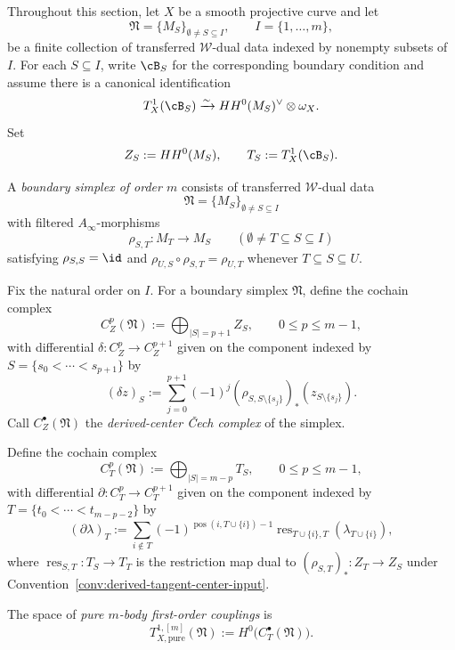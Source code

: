 \begin{convention}
\label{conv:derived-tangent-center-input}
Throughout this section, let $X$ be a smooth projective curve and let
\[
\mathfrak N=\{M_S\}_{\emptyset\neq S\subseteq I},\qquad I=\{1,\dots,m\},
\]
be a finite collection of transferred $\mathcal W$-dual data indexed by nonempty subsets of $I$.
For each $S\subseteq I$, write $\cB_S$ for the corresponding boundary condition and assume there is a canonical identification
\[
T^1_X(\cB_S)
\xrightarrow{\sim}
HH^0(M_S)^\vee\otimes \omega_X.
\]
Set
\[
Z_S:=HH^0(M_S),\qquad T_S:=T^1_X(\cB_S).
\]
\end{convention}

\begin{definition}
\label{def:w-boundary-simplex}
A \emph{boundary simplex of order $m$} consists of transferred $\mathcal W$-dual data
\[
\mathfrak N=\{M_S\}_{\emptyset\neq S\subseteq I}
\]
with filtered $A_\infty$-morphisms
\[
\rho_{S,T}\colon M_T\longrightarrow M_S
\qquad (\emptyset\neq T\subseteq S\subseteq I)
\]
satisfying $\rho_{S,S}=\id$ and $\rho_{U,S}\circ \rho_{S,T}=\rho_{U,T}$ whenever
$T\subseteq S\subseteq U$.
\end{definition}

\begin{definition}
\label{def:w-derived-center-cech}
Fix the natural order on $I$. For a boundary simplex $\mathfrak N$, define the cochain complex
\[
C_Z^p(\mathfrak N):=\bigoplus_{|S|=p+1} Z_S,
\qquad 0\le p\le m-1,
\]
with differential $\delta\colon C_Z^p\to C_Z^{p+1}$ given on the component indexed by
$S=\{s_0<\cdots<s_{p+1}\}$ by
\[
(\delta z)_S
:=
\sum_{j=0}^{p+1}(-1)^j (\rho_{S,S\setminus\{s_j\}})_*(z_{S\setminus\{s_j\}}).
\]
Call $C_Z^\bullet(\mathfrak N)$ the \emph{derived-center \v{C}ech complex} of the simplex.
\end{definition}

\begin{definition}
\label{def:w-tangent-restriction-complex}
Define the cochain complex
\[
C_T^p(\mathfrak N):=\bigoplus_{|S|=m-p} T_S,
\qquad 0\le p\le m-1,
\]
with differential $\partial\colon C_T^p\to C_T^{p+1}$ given on the component indexed by
$T=\{t_0<\cdots<t_{m-p-2}\}$ by
\[
(\partial\lambda)_T
:=
\sum_{i\notin T}(-1)^{\operatorname{pos}(i,T\cup\{i\})-1}
\operatorname{res}_{T\cup\{i\},T}(\lambda_{T\cup\{i\}}),
\]
where $\operatorname{res}_{S,T}\colon T_S\to T_T$ is the restriction map dual to
$(\rho_{S,T})_*\colon Z_T\to Z_S$ under Convention~\ref{conv:derived-tangent-center-input}.

The space of \emph{pure $m$-body first-order couplings} is
\[
T^{1,[m]}_{X,\mathrm{pure}}(\mathfrak N):=H^0\bigl(C_T^\bullet(\mathfrak N)\bigr).
\]
\end{definition}

